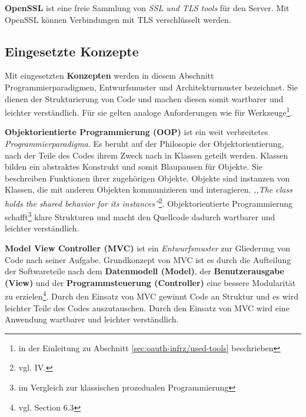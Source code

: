 \documentclass[12pt,a4paper,pointednumbers,abstracton]{scrartcl}
\begin{document}
\textbf{OpenSSL} ist eine freie Sammlung von \emph{SSL und TLS tools} für den Server.
Mit OpenSSL können Verbindungen mit TLS verschlüsselt werden.



\subsection{Eingesetzte Konzepte}
\label{sec:oauth-infrz/concepts}

Mit eingesetzten \textbf{Konzepten} werden in diesem Abschnitt Programmierparadigmen, Entwurfsmuster und Architekturmuster bezeichnet.
Sie dienen der Strukturierung von Code und machen diesen somit wartbarer und leichter verständlich.
Für sie gelten analoge Anforderungen wie für Werkzeuge\footnote{in der Einleitung zu Abschnitt \ref{sec:oauth-infrz/used-tools} beschrieben}.

\textbf{Objektorientierte Programmierung (OOP)} ist ein weit verbreitetes \emph{Programmierparadigma}.
Es beruht auf der Philosopie der Objektorientierung, nach der Teile des Codes ihrem Zweck nach in Klassen geteilt werden.
Klassen bilden ein abstraktes Konstrukt und somit Blaupausen für Objekte. Sie beschreiben Funktionen ihrer zugehörigen Objekte.
Objekte sind instanzen von Klassen, die mit anderen Objekten kommunizieren und interagieren.
\emph{,,The class holds the shared behavior for its instances''}\footnote{vgl. \cite{Kay1993} IV.}.
Objektorientierte Programmierung schafft\footnote{im Vergleich zur klassischen prozedualen Programmierung} klare Strukturen und macht den Quellcode dadurch wartbarer und leichter verständlich.

\textbf{Model View Controller (MVC)} ist ein \emph{Entwurfsmuster} zur Gliederung von Code nach seiner Aufgabe.
Grundkonzept von MVC ist es durch die Aufteilung der Softwareteile nach dem \textbf{Datenmodell (Model)}, der \textbf{Benutzerausgabe (View)} und der \textbf{Programmsteuerung (Controller)} eine bessere Modularität zu erzielen\footnote{vgl. \cite{Som2010} Section 6.3}.
Durch den Einsatz von MVC gewinnt Code an Struktur und es wird leichter Teile des Codes auszutauschen.
Durch den Einsatz von MVC wird eine Anwendung wartbarer und leichter verständlich.
\end{document}
